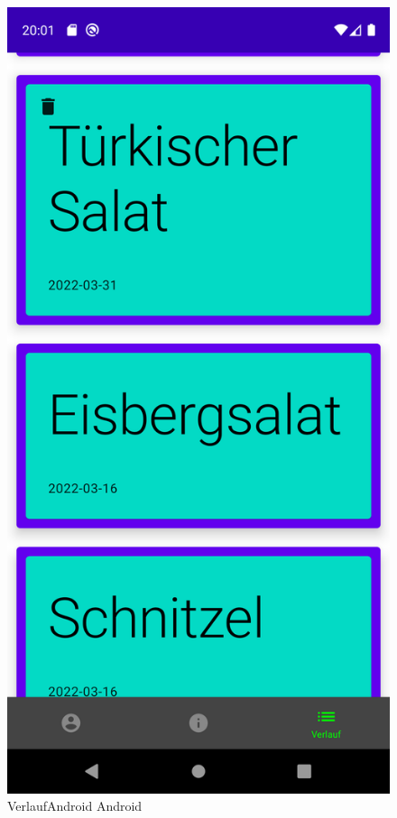 \begin{figure}[htp]
    \centering
    \author{Bozidar Spasenovic}
    \includegraphics[scale=0.09]{pics/VerlaufAndroid.png}
    \caption{VerlaufAndroid Android}
    \label{fig:impl:VerlaufAndroid}
\end{figure}

